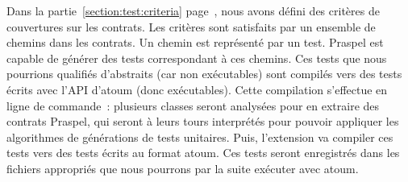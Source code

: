 Dans la partie~\ref{section:test:criteria} page~\pageref{section:test:criteria},
nous avons défini des critères de couvertures sur les contrats. Les critères
sont satisfaits par un ensemble de chemins dans les contrats. Un chemin est
représenté par un test. Praspel est capable de générer des tests correspondant à
ces chemins. Ces tests que nous pourrions qualifiés d'abstraits (car non
exécutables) sont compilés vers des tests écrits avec l'API d'atoum (donc
exécutables). Cette compilation s'effectue en ligne de commande~: plusieurs
classes seront analysées pour en extraire des contrats Praspel, qui seront à
leurs tours interprétés pour pouvoir appliquer les algorithmes de générations de
tests unitaires. Puis, l'extension va compiler ces tests vers des tests écrits
au format atoum. Ces tests seront enregistrés dans les fichiers appropriés
que nous pourrons par la suite exécuter avec atoum.

